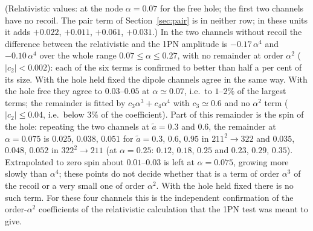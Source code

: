 \documentclass[11pt]{article}
\begin{document}
(Relativistic values: at the node $\alpha=0.07$ for the free hole; the first two channels have no recoil. The pair term of
Section~\ref{sec:pair} is in neither row; in these units it adds $+0.022$, $+0.011$, $+0.061$, $+0.031$.)
In the two channels without recoil the difference between the relativistic and the 1PN amplitude is $-0.17\,\alpha^4$ and
$-0.10\,\alpha^4$ over the whole range $0.07\le\alpha\le0.27$, with no remainder at order $\alpha^2$ ($|c_2|<0.002$): each of the six
terms is confirmed to better than half a per cent of its size. With the hole held fixed the dipole channels agree in the same way.
With the hole free they agree to $0.03$--$0.05$ at $\alpha\simeq0.07$, i.e.\ to $1$--$2\%$ of the largest terms; the remainder is fitted
by $c_3\alpha^3+c_4\alpha^4$ with $c_3\simeq0.6$ and no $\alpha^2$ term ($|c_2|\le0.04$, i.e.\ below $3\%$ of the coefficient).
Part of this remainder is the spin of the hole: repeating the two channels at $\tilde a=0.3$ and $0.6$, the remainder at
$\alpha=0.075$ is $0.025$, $0.038$, $0.051$ for $\tilde a=0.3$, $0.6$, $0.95$ in $211^2\to322$ and $0.035$, $0.048$, $0.052$ in
$322^2\to211$ (at $\alpha=0.25$: $0.12$, $0.18$, $0.25$ and $0.23$, $0.29$, $0.35$). Extrapolated to zero spin about $0.01$--$0.03$ is left
at $\alpha=0.075$, growing more slowly than $\alpha^4$; these points do not decide whether that is a term of order $\alpha^3$ of the
recoil or a very small one of order $\alpha^2$. With the hole held fixed there is no such term.
For these four channels this is the independent confirmation of the order-$\alpha^2$ coefficients of the relativistic calculation that the
1PN test was meant to give.
\end{document}
